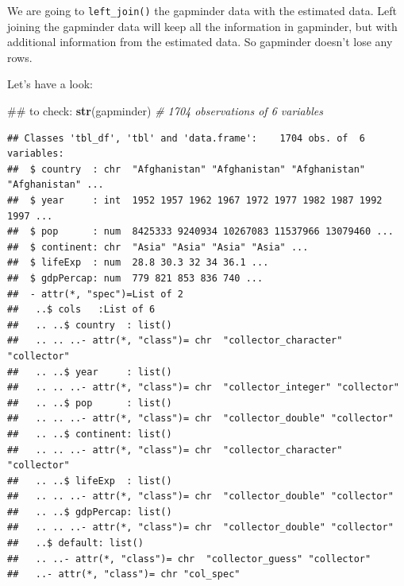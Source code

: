 \documentclass[]{book}
\newenvironment{Shaded}{\begin{snugshade}}{\end{snugshade}}
\newcommand{\KeywordTok}[1]{\textcolor[rgb]{0.13,0.29,0.53}{\textbf{{#1}}}}
\newcommand{\DataTypeTok}[1]{\textcolor[rgb]{0.13,0.29,0.53}{{#1}}}
\newcommand{\StringTok}[1]{\textcolor[rgb]{0.31,0.60,0.02}{{#1}}}
\newcommand{\CommentTok}[1]{\textcolor[rgb]{0.56,0.35,0.01}{\textit{{#1}}}}
\newcommand{\NormalTok}[1]{{#1}}
\theoremstyle{definition}
\theoremstyle{definition}
\theoremstyle{definition}
\theoremstyle{remark}
\begin{document}
We are going to \texttt{left\_join()} the gapminder data with the
estimated data. Left joining the gapminder data will keep all the
information in gapminder, but with additional information from the
estimated data. So gapminder doesn't lose any rows.

Let's have a look:

\begin{Shaded}
\begin{Highlighting}[]
\NormalTok{## to check:}
\KeywordTok{str}\NormalTok{(gapminder) }\CommentTok{# 1704 observations of 6 variables}
\end{Highlighting}
\end{Shaded}

\begin{verbatim}
## Classes 'tbl_df', 'tbl' and 'data.frame':    1704 obs. of  6 variables:
##  $ country  : chr  "Afghanistan" "Afghanistan" "Afghanistan" "Afghanistan" ...
##  $ year     : int  1952 1957 1962 1967 1972 1977 1982 1987 1992 1997 ...
##  $ pop      : num  8425333 9240934 10267083 11537966 13079460 ...
##  $ continent: chr  "Asia" "Asia" "Asia" "Asia" ...
##  $ lifeExp  : num  28.8 30.3 32 34 36.1 ...
##  $ gdpPercap: num  779 821 853 836 740 ...
##  - attr(*, "spec")=List of 2
##   ..$ cols   :List of 6
##   .. ..$ country  : list()
##   .. .. ..- attr(*, "class")= chr  "collector_character" "collector"
##   .. ..$ year     : list()
##   .. .. ..- attr(*, "class")= chr  "collector_integer" "collector"
##   .. ..$ pop      : list()
##   .. .. ..- attr(*, "class")= chr  "collector_double" "collector"
##   .. ..$ continent: list()
##   .. .. ..- attr(*, "class")= chr  "collector_character" "collector"
##   .. ..$ lifeExp  : list()
##   .. .. ..- attr(*, "class")= chr  "collector_double" "collector"
##   .. ..$ gdpPercap: list()
##   .. .. ..- attr(*, "class")= chr  "collector_double" "collector"
##   ..$ default: list()
##   .. ..- attr(*, "class")= chr  "collector_guess" "collector"
##   ..- attr(*, "class")= chr "col_spec"
\end{verbatim}

\begin{Shaded}
\end{Shaded}
\end{document}
